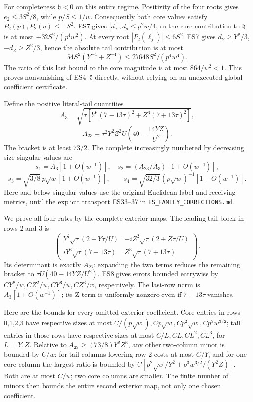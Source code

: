 For completeness \(\mathfrak h<0\) on this entire regime. Positivity of the four roots gives \(e_2\le3S^2/8\), while \(p/S\le1/w\). Consequently both core values satisfy \(P_2(p),P_2(a)\le-S^2\). ES7 gives \(|d_p|,d_a\le p^2w/4\), so the core contribution to \(\mathfrak h\) is at most \(-32S^2/(p^4w^2)\). At every root \(|P_2(\ell_j)|\le6S^2\). ES7 gives \(d_Y\ge Y^2/3\), \(-d_Z\ge Z^2/3\), hence the absolute tail contribution is at most \[
54S^2(Y^{-4}+Z^{-4})\le27648S^2/(p^4w^4).
\] The ratio of this last bound to the core magnitude is at most \(864/w^2<1\). This proves nonvanishing of ES4--5 directly, without relying on an unexecuted global coefficient certificate.

Define the positive literal-tail quantities \[
A_3=\sqrt{\tau[Y^6(7-13\tau)^2+Z^6(7+13\tau)^2]},
\] \[
A_{23}=\tau^2Y^2Z^2U\left(40-\frac{14YZ}{U^2}\right).
\tag{ES9}
\] The bracket is at least \(73/2\). The complete increasingly numbered by decreasing size singular values are \[
s_1=A_3[1+O(w^{-1})],\quad s_2=(A_{23}/A_3)[1+O(w^{-1})],
\] \[
s_3=\sqrt{3/8}\,p\sqrt w[1+O(w^{-1})],\qquad
s_4=\sqrt{32/3}\,(p\sqrt w)^{-1}[1+O(w^{-1})].
\tag{ES10}
\] Here and below singular values use the original Euclidean label and receiving metrics, until the explicit transport ES33--37 in \texttt{ES\_FAMILY\_CORRECTIONS.md}.

We prove all four rates by the complete exterior maps. The leading tail block in rows 2 and 3 is \[
\begin{pmatrix}
Y^2\sqrt\tau(2-Y\tau/U)&-iZ^2\sqrt\tau(2+Z\tau/U)\\
iY^3\sqrt\tau(7-13\tau)&Z^3\sqrt\tau(7+13\tau)
\end{pmatrix}.
\tag{ES11}
\] Its determinant is exactly \(A_{23}\): expanding the two terms reduces the remaining bracket to \(\tau U(40-14YZ/U^2)\). ES8 gives errors bounded entrywise by \(CY^2/w,CZ^2/w,CY^3/w,CZ^3/w\), respectively. The last-row norm is \(A_3[1+O(w^{-1})]\); its Z term is uniformly nonzero even if \(7-13\tau\) vanishes.

Here are the bounds for every omitted exterior coefficient. Core entries in rows 0,1,2,3 have respective sizes at most \(C/(p\sqrt w),Cp\sqrt w,Cp^2\sqrt w,Cp^3w^{3/2}\); tail entries in those rows have respective sizes at most \(C/L,CL,CL^2,CL^3\), for \(L=Y,Z\). Relative to \(A_{23}\ge(73/8)Y^2Z^3\), any other two-column minor is bounded by \(C/w\): for tail columns lowering row 2 costs at most \(C/Y\), and for one core column the largest ratio is bounded by \(C[p^2\sqrt w/Y^2+p^3w^{3/2}/(Y^2Z)]\). Both are at most \(C/w\); two core columns are smaller. The finite number of minors then bounds the entire second exterior map, not only one chosen coefficient.

